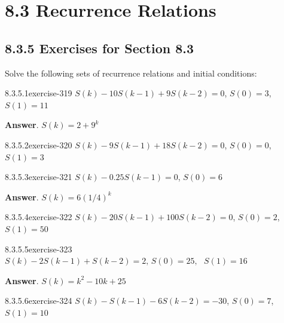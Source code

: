 \documentclass[twoside,10pt,]{book}
\numberwithin{equation}{section}
\begin{document}
\section*{8.3 Recurrence Relations}
\subsection*{8.3.5 Exercises for Section 8.3}
\hypertarget{p-2709}{}%
Solve the following sets of recurrence relations and initial conditions:%
\begin{exercisegroup}
\begin{divisionsolutioneg}{8.3.5.1}{}{exercise-319}%
\hypertarget{p-2710}{}%
\(S(k) - 10S(k - 1) + 9S(k - 2) = 0\), \(S(0) = 3\), \(S(1) = 11\)%
\par\smallskip%
\noindent\textbf{Answer}.\quad%
\hypertarget{p-2711}{}%
\(S(k)=2+9^k\)%
\end{divisionsolutioneg}%
\begin{divisionsolutioneg}{8.3.5.2}{}{exercise-320}%
\hypertarget{p-2712}{}%
\(S(k) - 9S(k - 1) + 18S(k - 2) = 0\), \(S(0) = 0\), \(S(1) = 3\)%
\end{divisionsolutioneg}%
\begin{divisionsolutioneg}{8.3.5.3}{}{exercise-321}%
\hypertarget{p-2713}{}%
\(S(k) - 0.25S(k - 1) = 0\), \(S(0) = 6\)%
\par\smallskip%
\noindent\textbf{Answer}.\quad%
\hypertarget{p-2714}{}%
\(S(k)=6(1/4)^k\)%
\end{divisionsolutioneg}%
\begin{divisionsolutioneg}{8.3.5.4}{}{exercise-322}%
\hypertarget{p-2715}{}%
\(S(k) - 20S(k - 1) + 100S(k - 2) = 0\), \(S(0) = 2\), \(S(1) = 50\)%
\end{divisionsolutioneg}%
\begin{divisionsolutioneg}{8.3.5.5}{}{exercise-323}%
\hypertarget{p-2716}{}%
\(S(k) - 2S(k - 1) + S(k - 2) = 2 \textrm{,  }S(0) = 25,\textrm{  }S(1) = 16\)%
\par\smallskip%
\noindent\textbf{Answer}.\quad%
\hypertarget{p-2717}{}%
\(S(k)=k^2-10k+25\)%
\end{divisionsolutioneg}%
\begin{divisionsolutioneg}{8.3.5.6}{}{exercise-324}%
\hypertarget{p-2718}{}%
\(S(k) - S(k - 1) - 6S(k - 2) = -30\), \(S(0) = 7\), \(S(1) = 10\)%
\end{divisionsolutioneg}%

\end{exercisegroup}
\end{document}
